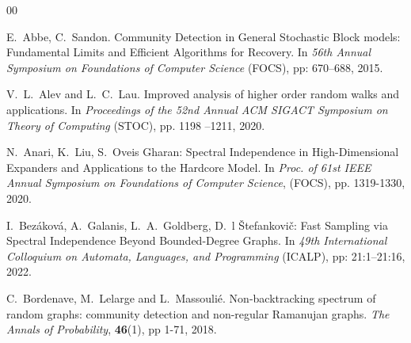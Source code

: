 \documentclass[11pt,reqno]{amsart}
\numberwithin{equation}{section}
\begin{document}
\begin{thebibliography}{00}


E.~Abbe, C.~Sandon.
Community Detection in General Stochastic Block models: Fundamental Limits and Efficient Algorithms for Recovery. 
In {\em 56th Annual Symposium on Foundations of Computer Science} (FOCS), pp: 670--688, 2015. 


V.~L.~Alev and L.~C.~Lau. Improved analysis of higher order random walks and applications. In 
{\em Proceedings of the 52nd Annual ACM SIGACT Symposium on Theory of Computing} (STOC), pp. 1198 --1211, 2020.









N.~Anari, K.~Liu, S.~Oveis Gharan:
Spectral Independence in High-Dimensional Expanders and Applications to the Hardcore Model. 
In {\em Proc. of 61st {IEEE} Annual Symposium on Foundations of Computer Science}, (FOCS), 
pp. 1319-1330, 2020.






I.~Bez\'akov\'a, A.~Galanis, L.~A.~Goldberg, D.~l \v Stefankovi\v c:
Fast Sampling via Spectral Independence Beyond Bounded-Degree Graphs. In {\em 
49th International Colloquium on Automata, Languages, and Programming} (ICALP), pp: 21:1--21:16, 2022. 




C.~Bordenave, M.~Lelarge and L.~Massouli\'e. 
Non-backtracking spectrum of random graphs: community detection and non-regular Ramanujan graphs.
%
{\em The Annals of Probability}, {\bf 46}(1), pp 1-71, 2018. 




\end{thebibliography}
\end{document}
